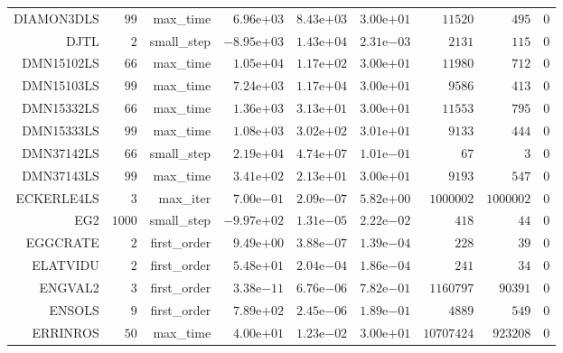 \begin{longtable}{rrrrrrrrr}
DIAMON3DLS & \(    99\) & max\_time & \( 6.96\)e\(+03\) & \( 8.43\)e\(+03\) & \( 3.00\)e\(+01\) & \( 11520\) & \(   495\) & \(     0\) \\
DJTL & \(     2\) & small\_step & \(-8.95\)e\(+03\) & \( 1.43\)e\(+04\) & \( 2.31\)e\(-03\) & \(  2131\) & \(   115\) & \(     0\) \\
DMN15102LS & \(    66\) & max\_time & \( 1.05\)e\(+04\) & \( 1.17\)e\(+02\) & \( 3.00\)e\(+01\) & \( 11980\) & \(   712\) & \(     0\) \\
DMN15103LS & \(    99\) & max\_time & \( 7.24\)e\(+03\) & \( 1.17\)e\(+04\) & \( 3.00\)e\(+01\) & \(  9586\) & \(   413\) & \(     0\) \\
DMN15332LS & \(    66\) & max\_time & \( 1.36\)e\(+03\) & \( 3.13\)e\(+01\) & \( 3.00\)e\(+01\) & \( 11553\) & \(   795\) & \(     0\) \\
DMN15333LS & \(    99\) & max\_time & \( 1.08\)e\(+03\) & \( 3.02\)e\(+02\) & \( 3.01\)e\(+01\) & \(  9133\) & \(   444\) & \(     0\) \\
DMN37142LS & \(    66\) & small\_step & \( 2.19\)e\(+04\) & \( 4.74\)e\(+07\) & \( 1.01\)e\(-01\) & \(    67\) & \(     3\) & \(     0\) \\
DMN37143LS & \(    99\) & max\_time & \( 3.41\)e\(+02\) & \( 2.13\)e\(+01\) & \( 3.00\)e\(+01\) & \(  9193\) & \(   547\) & \(     0\) \\
ECKERLE4LS & \(     3\) & max\_iter & \( 7.00\)e\(-01\) & \( 2.09\)e\(-07\) & \( 5.82\)e\(+00\) & \(1000002\) & \(1000002\) & \(     0\) \\
EG2 & \(  1000\) & small\_step & \(-9.97\)e\(+02\) & \( 1.31\)e\(-05\) & \( 2.22\)e\(-02\) & \(   418\) & \(    44\) & \(     0\) \\
EGGCRATE & \(     2\) & first\_order & \( 9.49\)e\(+00\) & \( 3.88\)e\(-07\) & \( 1.39\)e\(-04\) & \(   228\) & \(    39\) & \(     0\) \\
ELATVIDU & \(     2\) & first\_order & \( 5.48\)e\(+01\) & \( 2.04\)e\(-04\) & \( 1.86\)e\(-04\) & \(   241\) & \(    34\) & \(     0\) \\
ENGVAL2 & \(     3\) & first\_order & \( 3.38\)e\(-11\) & \( 6.76\)e\(-06\) & \( 7.82\)e\(-01\) & \(1160797\) & \( 90391\) & \(     0\) \\
ENSOLS & \(     9\) & first\_order & \( 7.89\)e\(+02\) & \( 2.45\)e\(-06\) & \( 1.89\)e\(-01\) & \(  4889\) & \(   549\) & \(     0\) \\
ERRINROS & \(    50\) & max\_time & \( 4.00\)e\(+01\) & \( 1.23\)e\(-02\) & \( 3.00\)e\(+01\) & \(10707424\) & \(923208\) & \(     0\) \\

\end{longtable}
